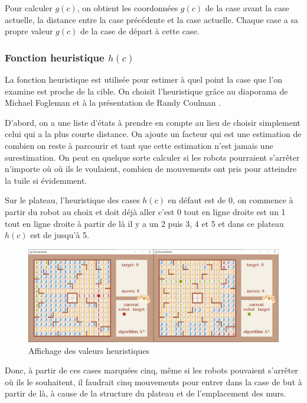 \documentclass[12pt, pdflatex]{article}
\begin{document}
        Pour calculer $g(c)$, on obtient les coordonnées $g(c)$ de la case avant la case actuelle, la distance entre la case précédente et la case actuelle. Chaque case a sa propre valeur $g(c)$ de la case de départ à cette case.

        \subsubsection{Fonction heuristique \texorpdfstring{$h(c)$}{h(c)}}
        La fonction heuristique est utilisée pour estimer à quel point la case que l'on examine est proche de la cible. On choisit l'heuristique grâce au diaporama de Michael Fogleman \cite{heuristic} et à la présentation de Randy Coulman \cite{youtube}. 

        D'abord, on a une liste d'états à prendre en compte au lieu de choisir simplement celui qui a la plus courte distance. On ajoute un facteur qui est une estimation de combien on reste à parcourir et tant que cette estimation n'est jamais une surestimation. On peut en quelque sorte calculer si les robots pourraient s'arrêter n'importe où où ils le voulaient, combien de mouvements ont pris pour atteindre la tuile si évidemment.

        Sur le plateau, l'heuristique des cases $h(c)$ en défaut est de 0, on commence à partir du robot au choix et doit déjà aller c'est 0 tout en ligne droite est un 1 tout en ligne droite à partir de là il y a un 2 puis 3, 4 et 5 et dans ce plateau $h(c)$ est de jusqu’à 5.

        \begin{figure}[H]
            \centering
            \includegraphics[width=1\textwidth]{sources/heuristic.png}
            \caption{Affichage des valeurs heuristiques}
        \end{figure}

        Donc, à partir de ces cases marquées cinq, même si les robots pouvaient s'arrêter où ils le souhaitent, il faudrait cinq mouvements pour entrer dans la case de but à partir de là, à cause de la structure du plateau et de l'emplacement des murs.
\end{document}
